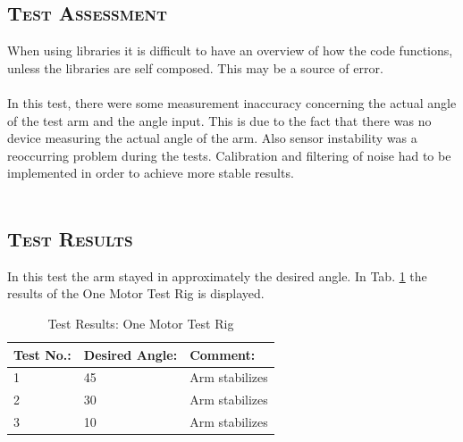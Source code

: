 \subsection*{\textsc{\medium Test Assessment}}
When using libraries it is difficult to have an overview of how the code functions, unless the libraries are self composed. This may be a source of error.
\\\\
In this test, there were some measurement inaccuracy concerning the actual angle of the test arm and the angle input. This is due to the fact that there was no device measuring the actual angle of the arm. Also sensor instability was a reoccurring problem during the tests. Calibration and filtering of noise had to be implemented in order to achieve more stable results.
\\\\

\subsection*{\textsc{\medium Test Results}}
In this test the arm stayed in approximately the desired angle. In Tab. \ref{tab:tabt3} the results of the One Motor Test Rig is displayed. 
\begin {table}[H]
    \begin{center}
    \caption {Test Results: One Motor Test Rig} 
    \label{tab:tabt3} 
    \begin{tabular}{|l|l|l|}\hline 
        Test No.:  & Desired Angle:   & Comment:\\ \hline
        1         & 45    &  Arm stabilizes   \\ \hline
        2         & 30    &  Arm stabilizes    \\ \hline
        3         & 10    &  Arm stabilizes    \\ \hline
    \end{tabular}
    \end{center}
\end{table}
\newpage

